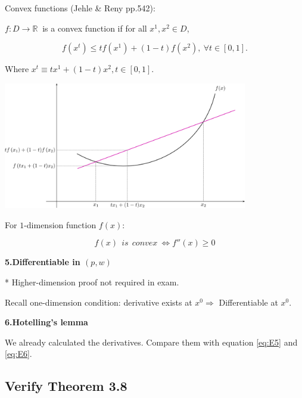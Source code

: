 \documentclass{article}
\newcommand{\R}{\mathbb{R}}
\begin{document}
Convex functions (Jehle \& Reny pp.542):

$f : D \to \R \ $ is a convex function if for all $x^1, x^2 \in D$,

$$f(x^t) \le tf(x^1) + (1 - t)f(x^2), \ \forall t \in [0, 1].$$

Where $x^t \equiv tx^1 + (1-t)x^2, t \in [0,1].$

\vspace{2mm}

{\centering
\includegraphics[width=0.8\textwidth]{5.convex}
\label{fig:convex}}

\vspace{2mm}

For $1$-dimension function $f(x)$:

$$f(x) \ \ is \ \ convex \ \iff f''(x) \ge 0$$

\vspace{2mm}

\textbf{5.Differentiable in $(p,w)$}

* Higher-dimension proof not required in exam.

Recall one-dimension condition: derivative exists at $x^0 \Rightarrow$ Differentiable at $x^0$.


\vspace{3mm}
\textbf{6.Hotelling's lemma}

We already calculated the derivatives. Compare them with equation \ref{eq:E5} and \ref{eq:E6}.
\subsection{Verify Theorem 3.8}
\end{document}
